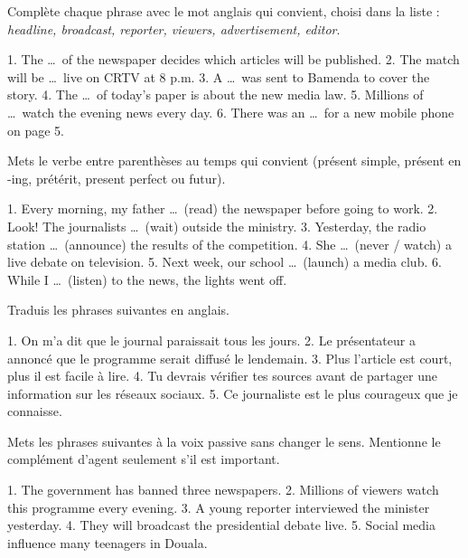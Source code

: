 \documentclass[11pt]{article}
\newcounter{popsec}
\newcounter{popsub}
\newcommand{\courssub}[1]{%
  \stepcounter{popsub}%
  \par\vspace{9pt}\noindent{\popxbold\fontsize{11.5}{13}\selectfont\color{popink}{\color{poporange}\thepopsec.\thepopsub}\hspace{6pt}#1}\par\nopagebreak\vspace{4pt}
}
\begin{document}
\begin{exercice}
Complète chaque phrase avec le mot anglais qui convient, choisi dans la liste : \emph{headline, broadcast, reporter, viewers, advertisement, editor}.

1. The \ldots\ of the newspaper decides which articles will be published.
2. The match will be \ldots\ live on CRTV at 8 p.m.
3. A \ldots\ was sent to Bamenda to cover the story.
4. The \ldots\ of today's paper is about the new media law.
5. Millions of \ldots\ watch the evening news every day.
6. There was an \ldots\ for a new mobile phone on page 5.
\end{exercice}

\begin{exercice}
Mets le verbe entre parenthèses au temps qui convient (présent simple, présent en -ing, prétérit, present perfect ou futur).

1. Every morning, my father \ldots\ (read) the newspaper before going to work.
2. Look! The journalists \ldots\ (wait) outside the ministry.
3. Yesterday, the radio station \ldots\ (announce) the results of the competition.
4. She \ldots\ (never / watch) a live debate on television.
5. Next week, our school \ldots\ (launch) a media club.
6. While I \ldots\ (listen) to the news, the lights went off.
\end{exercice}

\courssub{Je m'entraîne}

\begin{exercice}[Traduction]
Traduis les phrases suivantes en anglais.

1. On m'a dit que le journal paraissait tous les jours.
2. Le présentateur a annoncé que le programme serait diffusé le lendemain.
3. Plus l'article est court, plus il est facile à lire.
4. Tu devrais vérifier tes sources avant de partager une information sur les réseaux sociaux.
5. Ce journaliste est le plus courageux que je connaisse.
\end{exercice}

\begin{exercice}
Mets les phrases suivantes à la voix passive sans changer le sens. Mentionne le complément d'agent seulement s'il est important.

1. The government has banned three newspapers.
2. Millions of viewers watch this programme every evening.
3. A young reporter interviewed the minister yesterday.
4. They will broadcast the presidential debate live.
5. Social media influence many teenagers in Douala.
\end{exercice}
\end{document}
